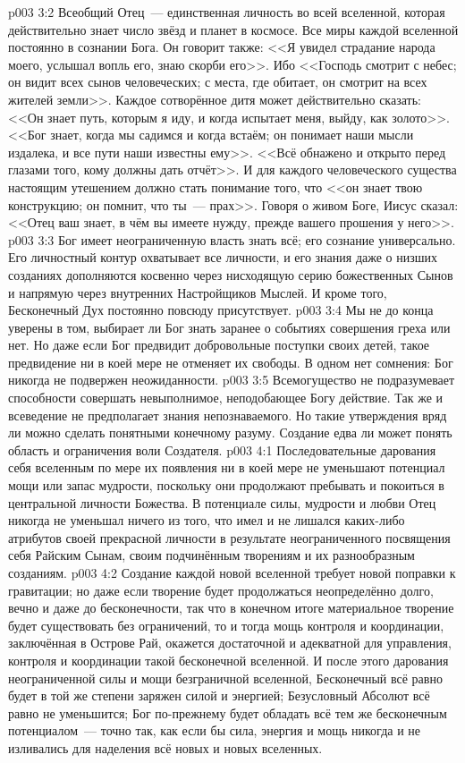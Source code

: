 \vs p003 3:2 Всеобщий Отец~--- единственная личность во всей вселенной, которая действительно знает число звёзд и планет в космосе. Все миры каждой вселенной постоянно в сознании Бога. Он говорит также: <<Я увидел страдание народа моего, услышал вопль его, знаю скорби его>>. Ибо <<Господь смотрит с небес; он видит всех сынов человеческих; с места, где обитает, он смотрит на всех жителей земли>>. Каждое сотворённое дитя может действительно сказать: <<Он знает путь, которым я иду, и когда испытает меня, выйду, как золото>>. <<Бог знает, когда мы садимся и когда встаём; он понимает наши мысли издалека, и все пути наши известны ему>>. <<Всё обнажено и открыто перед глазами того, кому должны дать отчёт>>. И для каждого человеческого существа настоящим утешением должно стать понимание того, что <<он знает твою конструкцию; он помнит, что ты~--- прах>>. Говоря о живом Боге, Иисус сказал: <<Отец ваш знает, в чём вы имеете нужду, прежде вашего прошения у него>>.
\vs p003 3:3 Бог имеет неограниченную власть знать всё; его сознание универсально. Его личностный контур охватывает все личности, и его знания даже о низших созданиях дополняются косвенно через нисходящую серию божественных Сынов и напрямую через внутренних Настройщиков Мыслей. И кроме того, Бесконечный Дух постоянно повсюду присутствует.
\vs p003 3:4 Мы не до конца уверены в том, выбирает ли Бог знать заранее о событиях совершения греха или нет. Но даже если Бог предвидит добровольные поступки своих детей, такое предвидение ни в коей мере не отменяет их свободы. В одном нет сомнения: Бог никогда не подвержен неожиданности.
\vs p003 3:5 \pc Всемогущество не подразумевает способности совершать невыполнимое, неподобающее Богу действие. Так же и всеведение не предполагает знания непознаваемого. Но такие утверждения вряд ли можно сделать понятными конечному разуму. Создание едва ли может понять область и ограничения воли Создателя.
\vs p003 4:1 Последовательные дарования себя вселенным по мере их появления ни в коей мере не уменьшают потенциал мощи или запас мудрости, поскольку они продолжают пребывать и покоиться в центральной личности Божества. В потенциале силы, мудрости и любви Отец никогда не уменьшал ничего из того, что имел и не лишался каких\hyp{}либо атрибутов своей прекрасной личности в результате неограниченного посвящения себя Райским Сынам, своим подчинённым творениям и их разнообразным созданиям.
\vs p003 4:2 Создание каждой новой вселенной требует новой поправки к гравитации; но даже если творение будет продолжаться неопределённо долго, вечно и даже до бесконечности, так что в конечном итоге материальное творение будет существовать без ограничений, то и тогда мощь контроля и координации, заключённая в Острове Рай, окажется достаточной и адекватной для управления, контроля и координации такой бесконечной вселенной. И после этого дарования неограниченной силы и мощи безграничной вселенной, Бесконечный всё равно будет в той же степени заряжен силой и энергией; Безусловный Абсолют всё равно не уменьшится; Бог по\hyp{}прежнему будет обладать всё тем же бесконечным потенциалом~--- точно так, как если бы сила, энергия и мощь никогда и не изливались для наделения всё новых и новых вселенных.
